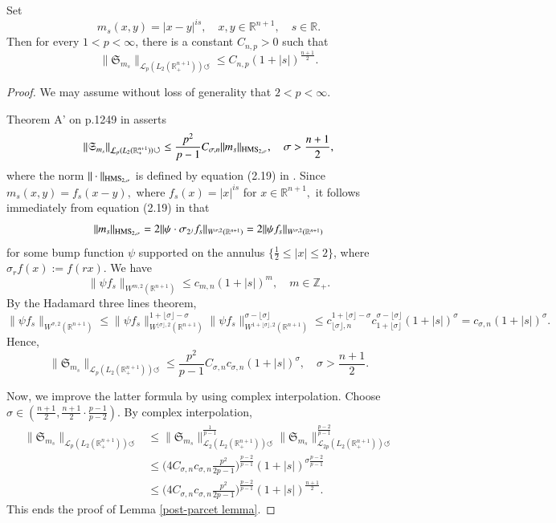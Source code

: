 \documentclass[12pt]{amsart}
\begin{document}
{\color{blue}
\begin{lemma}\label{post-parcet-adashed lemma} Set
$$m_s(x,y)=|x-y|^{is},\quad x,y\in\mathbb{R}^{n+1},\quad s\in\mathbb{R}.$$
Then for every $1<p<\infty$, there is a constant $C_{n,p}>0$ such that
$$\|\mathfrak{S}_{m_s}\|_{\mathcal{L}_p(L_2(\mathbb{R}_+^{n+1}))\circlearrowleft}\leq C_{n,p}(1+|s|)^{\frac{n+1}{2}}.$$
\end{lemma}
\begin{proof} We may assume without loss of generality that $2<p<\infty.$
	
Theorem A' on p.1249 in \cite{MR4660138} asserts
$$\|\mathfrak{S}_{m_s}\|_{\mathcal{L}_p(L_2(\mathbb{R}_+^{n+1}))\circlearrowleft}\leq \frac{p^2}{p-1}C_{\sigma,n}\|m_s\|_{{\rm HMS}_{2,\sigma}},\quad \sigma>\frac{n+1}{2},$$
where the norm $\|\cdot\|_{{\rm HMS}_{2,\sigma}}$ is defined by equation (2.19) in \cite{MR4660138}. Since $m_s(x,y)=f_s(x-y),$ where $f_s(x)=|x|^{is}$ for $x\in\mathbb{R}^{n+1},$ it follows immediately from equation (2.19) in \cite{MR4660138} that
$$\|m_s\|_{{\rm HMS}_{2,\sigma}}=2\|\psi\cdot \sigma_{2^{j}}f_s\|_{W^{\sigma,2}(\mathbb{R}^{n+1})}=2\|\psi f_s\|_{W^{\sigma,2}(\mathbb{R}^{n+1})}$$
for some bump function $\psi$ supported on the annulus $\{\frac12\leq |x|\leq 2\}$, where $\sigma_{r}f(x):=f(rx)$. We have
$$\|\psi f_s\|_{W^{m,2}(\mathbb{R}^{n+1})}\leq c_{m,n}(1+|s|)^m,\quad m\in\mathbb{Z}_+.$$
By the Hadamard three lines theorem,
$$\|\psi f_s\|_{W^{\sigma,2}(\mathbb{R}^{n+1})}\leq \|\psi f_s\|_{W^{\lfloor\sigma\rfloor,2}(\mathbb{R}^{n+1})}^{1+\lfloor\sigma\rfloor-\sigma}\|\psi f_s\|_{W^{1+\lfloor\sigma\rfloor,2}(\mathbb{R}^{n+1})}^{\sigma-\lfloor\sigma\rfloor}\leq c_{\lfloor\sigma\rfloor,n}^{1+\lfloor\sigma\rfloor-\sigma}c_{1+\lfloor\sigma\rfloor}^{\sigma-\lfloor\sigma\rfloor}(1+|s|)^{\sigma}=c_{\sigma,n}(1+|s|)^{\sigma}.$$
Hence,
$$\|\mathfrak{S}_{m_s}\|_{\mathcal{L}_p(L_2(\mathbb{R}_+^{n+1}))\circlearrowleft}\leq \frac{p^2}{p-1}C_{\sigma,n}c_{\sigma,n}(1+|s|)^{\sigma},\quad \sigma>\frac{n+1}{2}.$$

Now, we improve the latter formula by using complex interpolation. Choose $\sigma\in(\frac{n+1}{2},\frac{n+1}{2}\cdot\frac{p-1}{p-2}).$ By complex interpolation,
\begin{align*}
\|\mathfrak{S}_{m_s}\|_{\mathcal{L}_p(L_2(\mathbb{R}_+^{n+1}))\circlearrowleft}&\leq \|\mathfrak{S}_{m_s}\|_{\mathcal{L}_2(L_2(\mathbb{R}_+^{n+1}))\circlearrowleft}^{\frac1{p-1}}\|\mathfrak{S}_{m_s}\|_{\mathcal{L}_{2p}(L_2(\mathbb{R}_+^{n+1}))\circlearrowleft}^{\frac{p-2}{p-1}}\\
&\leq \big(4C_{\sigma,n}c_{\sigma,n}\frac{p^2}{2p-1}\big)^{\frac{p-2}{p-1}}(1+|s|)^{\sigma\frac{p-2}{p-1}}\\
&\leq \big(4C_{\sigma,n}c_{\sigma,n}\frac{p^2}{2p-1}\big)^{\frac{p-2}{p-1}}(1+|s|)^{\frac{n+1}{2}}.
\end{align*}
This ends the proof of Lemma \ref{post-parcet lemma}.
\end{proof}}
\end{document}
